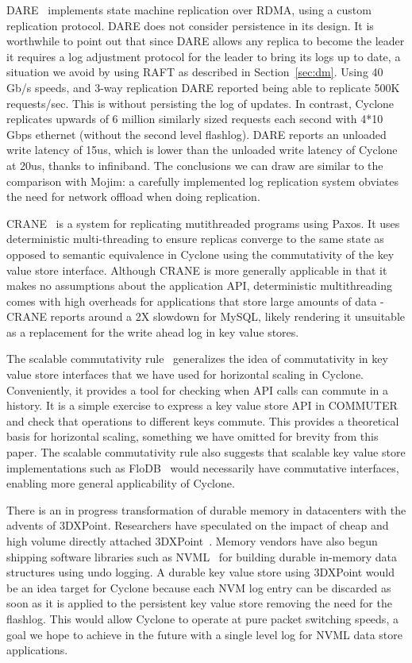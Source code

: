 \documentclass[pageno]{jpaper}
\begin{document}
DARE~\cite{dare} implements state machine replication over RDMA, using a custom
replication protocol. DARE does not consider persistence in its design. It is
worthwhile to point out that since DARE allows any replica to become the leader
it requires a log adjustment protocol for the leader to bring its logs up to
date, a situation we avoid by using RAFT as described in
Section~\ref{sec:dm}. Using 40 Gb/s speeds, and 3-way replication DARE reported
being able to replicate 500K requests/sec. This is without persisting the log of
updates. In contrast, Cyclone replicates upwards of 6 million similarly sized
requests each second with 4*10 Gbps ethernet (without the second level
flashlog). DARE reports an unloaded write latency of 15us, which is lower than
the unloaded write latency of Cyclone at 20us, thanks to infiniband. The
conclusions we can draw are similar to the comparison with Mojim: a carefully
implemented log replication system obviates the need for network offload when
doing replication.

{CRANE}~\cite{crane} is a system for replicating mutithreaded programs using
Paxos. It uses deterministic multi-threading to ensure replicas converge to the
same state as opposed to semantic equivalence in Cyclone using the commutativity
of the key value store interface. Although CRANE is more generally applicable in
that it makes no assumptions about the application API, deterministic
multithreading comes with high overheads for applications that store large
amounts of data - CRANE reports around a 2X slowdown for MySQL, likely rendering
it unsuitable as a replacement for the write ahead log in key value stores.

The scalable commutativity rule~\cite{scalable_commutativity} generalizes the
idea of commutativity in key value store interfaces that we have used for
horizontal scaling in Cyclone. Conveniently, it provides a tool for checking when
API calls can commute in a history. It is a simple exercise to express a key
value store API in COMMUTER and check that operations to different keys
commute. This provides a theoretical basis for horizontal scaling, something we
have omitted for brevity from this paper. The scalable commutativity rule also
suggests that scalable key value store implementations such as
FloDB~\cite{flodb} would necessarily have commutative interfaces, enabling more
general applicability of Cyclone.

There is an in progress transformation of durable memory in datacenters
with the advents of 3DXPoint. Researchers have speculated on the impact of cheap
and high volume directly attached 3DXPoint~\cite{tiering}. Memory vendors have
also begun shipping software libraries such as NVML~\cite{nvml} for building durable
in-memory data structures using undo logging. A durable key value store using
3DXPoint would be an idea target for Cyclone because each NVM log entry can be
discarded as soon as it is applied to the persistent key value store removing
the need for the flashlog. This would allow Cyclone to operate at pure packet
switching speeds, a goal we hope to achieve in the future with a single level
log for NVML data store applications.
\end{document}

